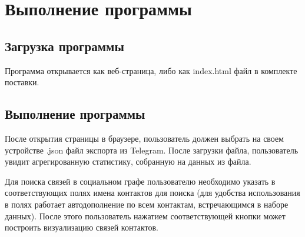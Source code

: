 \section{Выполнение программы}

\subsection{Загрузка программы}

Программа открывается как веб-страница, либо как index.html файл в комплекте поставки.

\subsection{Выполнение программы}

После открытия страницы в браузере, пользователь должен выбрать на своем устройстве .json файл экспорта из Telegram.
После загрузки файла, пользователь увидит агрегированную статистику, собранную на данных из файла.

Для поиска связей в социальном графе пользователю необходимо указать в соответствующих полях имена контактов для поиска (для удобства использования в полях работает автодополнение по всем контактам, встречающимся в наборе данных).
После этого пользователь нажатием соответствующей кнопки может построить визуализацию связей контактов.